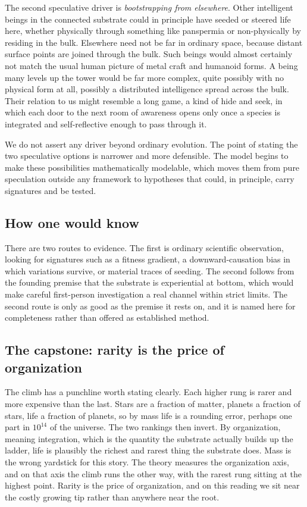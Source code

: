 The second speculative driver is \emph{bootstrapping from elsewhere}. Other intelligent beings in the connected
substrate could in principle have seeded or steered life here, whether physically through something like
panspermia or non-physically by residing in the bulk. Elsewhere need not be far in ordinary space, because distant
surface points are joined through the bulk. Such beings would almost certainly not match the usual human picture of
metal craft and humanoid forms. A being many levels up the tower would be far more complex, quite possibly with no
physical form at all, possibly a distributed intelligence spread across the bulk. Their relation to us might
resemble a long game, a kind of hide and seek, in which each door to the next room of awareness opens only once a
species is integrated and self-reflective enough to pass through it.

We do not assert any driver beyond ordinary evolution. The point of stating the two speculative options is narrower
and more defensible. The model begins to make these possibilities mathematically modelable, which moves them from
pure speculation outside any framework to hypotheses that could, in principle, carry signatures and be tested.

\subsection{How one would know}

There are two routes to evidence. The first is ordinary scientific observation, looking for signatures such as a
fitness gradient, a downward-causation bias in which variations survive, or material traces of seeding. The second
follows from the founding premise that the substrate is experiential at bottom, which would make careful
first-person investigation a real channel within strict limits. The second route is only as good as the premise it
rests on, and it is named here for completeness rather than offered as established method.

\subsection{The capstone: rarity is the price of organization}

The climb has a punchline worth stating clearly. Each higher rung is rarer and more expensive than the last. Stars
are a fraction of matter, planets a fraction of stars, life a fraction of planets, so by mass life is a rounding
error, perhaps one part in $10^{14}$ of the universe. The two rankings then invert. By organization, meaning
integration, which is the quantity the substrate actually builds up the ladder, life is plausibly the richest and
rarest thing the substrate does. Mass is the wrong yardstick for this story. The theory measures the organization
axis, and on that axis the climb runs the other way, with the rarest rung sitting at the highest point. Rarity is
the price of organization, and on this reading we sit near the costly growing tip rather than anywhere near the
root.


